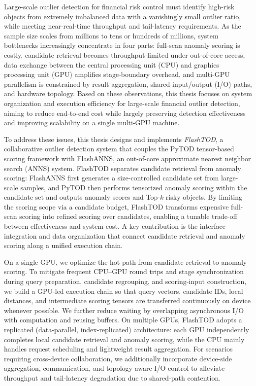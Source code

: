 \begin{abstract*}
Large-scale outlier detection for financial risk control must identify high-risk objects from extremely imbalanced data with a vanishingly small outlier ratio, while meeting near-real-time throughput and tail-latency requirements. As the sample size scales from millions to tens or hundreds of millions, system bottlenecks increasingly concentrate in four parts: full-scan anomaly scoring is costly, candidate retrieval becomes throughput-limited under out-of-core access, data exchange between the central processing unit (CPU) and graphics processing unit (GPU) amplifies stage-boundary overhead, and multi-GPU parallelism is constrained by result aggregation, shared input/output (I/O) paths, and hardware topology. Based on these observations, this thesis focuses on system organization and execution efficiency for large-scale financial outlier detection, aiming to reduce end-to-end cost while largely preserving detection effectiveness and improving scalability on a single multi-GPU machine.

To address these issues, this thesis designs and implements \emph{FlashTOD}, a collaborative outlier detection system that couples the PyTOD tensor-based scoring framework with FlashANNS, an out-of-core approximate nearest neighbor search (ANNS) system. FlashTOD separates candidate retrieval from anomaly scoring: FlashANNS first generates a size-controlled candidate set from large-scale samples, and PyTOD then performs tensorized anomaly scoring within the candidate set and outputs anomaly scores and Top-$k$ risky objects. By limiting the scoring scope via a candidate budget, FlashTOD transforms expensive full-scan scoring into refined scoring over candidates, enabling a tunable trade-off between effectiveness and system cost. A key contribution is the interface integration and data organization that connect candidate retrieval and anomaly scoring along a unified execution chain.

On a single GPU, we optimize the hot path from candidate retrieval to anomaly scoring. To mitigate frequent CPU--GPU round trips and stage synchronization during query preparation, candidate regrouping, and scoring-input construction, we build a GPU-led execution chain so that query vectors, candidate IDs, local distances, and intermediate scoring tensors are transferred continuously on device whenever possible. We further reduce waiting by overlapping asynchronous I/O with computation and reusing buffers. On multiple GPUs, FlashTOD adopts a replicated (data-parallel, index-replicated) architecture: each GPU independently completes local candidate retrieval and anomaly scoring, while the CPU mainly handles request scheduling and lightweight result aggregation. For scenarios requiring cross-device collaboration, we additionally incorporate device-side aggregation, communication, and topology-aware I/O control to alleviate throughput and tail-latency degradation due to shared-path contention.


\end{abstract*}
